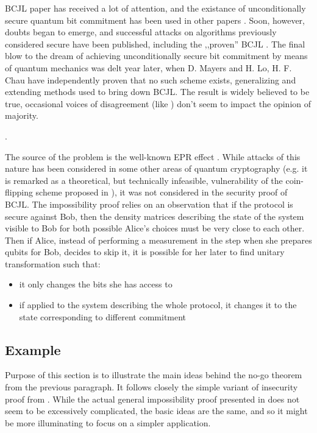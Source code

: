 \documentclass[10pt]{article}
\begin{document}
BCJL paper has received a lot of attention, and the existance of unconditionally secure quantum bit
commitment has been used in other papers \cite{Yao95}. Soon, however, doubts began to emerge, and
successful attacks on algorithms previously considered secure have been published, including the
,,proven'' BCJL \cite{Lo96,Mayers96}\footnotemark. The final blow to the dream of achieving unconditionally
secure bit commitment by means of quantum mechanics was delt year later, when D. Mayers \cite{Mayers97}
and H. Lo, H. F. Chau \cite{Lo98} have independently proven that no such scheme exists, generalizing
and extending methods used to bring down BCJL. The result is widely believed to be true, occasional
voices of disagreement (like \cite{Yuen01}) don't seem to impact the opinion of majority.

. 

The source of the problem is the well-known EPR effect \cite{EPR}. While  attacks of this nature has
been considered in some other areas of quantum cryptography (e.g. it is remarked as a theoretical,
but technically infeasible, vulnerability of the coin-flipping scheme proposed in \cite{bb84}),
it was not considered in the security proof of BCJL. The impossibility proof relies on an observation
that if the protocol is secure against Bob, then the density matrices describing the state of the
system visible to Bob for both possible Alice's choices must be very close to each other. Then if 
Alice, instead of performing a measurement in the step when she prepares qubits for Bob, decides to
skip it, it is possible for her later to find unitary transformation such that:
\begin{itemize}
  \item it only changes the bits she has access to
  \item if applied to the system describing the whole protocol, it changes it to the state 
    corresponding to different commitment
\end{itemize}

\subsection*{Example}

Purpose of this section is to illustrate the main ideas behind the no-go theorem from the previous
paragraph. It follows closely the simple variant of insecurity proof from \cite{Lo96}. While the actual
general impossibility proof presented in \cite{Mayers97} does not seem to be excessively complicated,
the basic ideas are the same, and so it might be more illuminating to focus on a simpler application.
\end{document}
